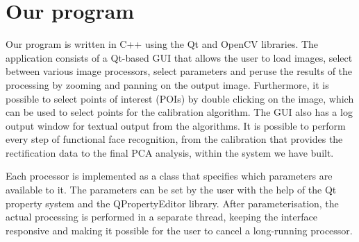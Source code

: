 \section{Our program}
\label{sec:prog}
Our program is written in C++ using the Qt and OpenCV libraries. The application
consists of a Qt-based GUI that allows the user to load images, select between
various image processors, select parameters and peruse the results of the
processing by zooming and panning on the output image. Furthermore, it is
possible to select points of interest (POIs) by double clicking on the image,
which can be used to select points for the calibration algorithm. The GUI also
has a log output window for textual output from the algorithms. It is possible
to perform every step of functional face recognition, from the calibration that
provides the rectification data to the final PCA analysis, within the system we
have built.

Each processor is implemented as a class that specifies which parameters are
available to it. The parameters can be set by the user with the help of the Qt
property system and the QPropertyEditor library. After parameterisation, the
actual processing is performed in a separate thread, keeping the interface
responsive and making it possible for the user to cancel a long-running
processor.




